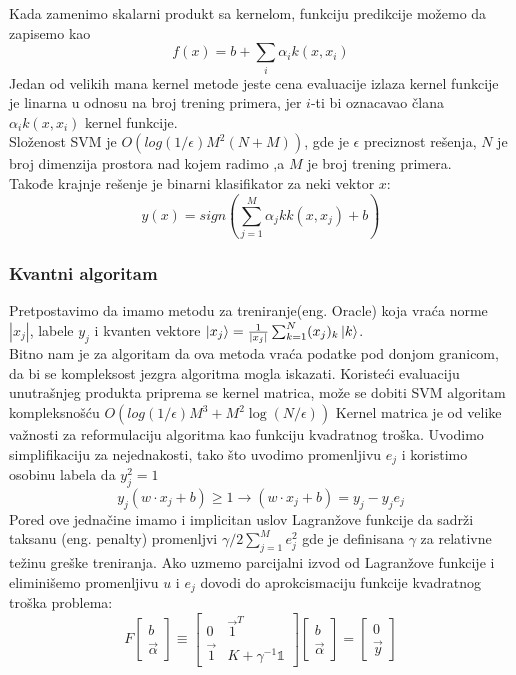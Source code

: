 \documentclass[12pt, letterpaper, oneside]{article}
\begin{document}
Kada zamenimo skalarni produkt sa kernelom, funkciju predikcije možemo da zapisemo kao
\[
    f(x) = b + \sum_i \alpha_{i}k(x,x_i)
\]
Jedan od velikih mana kernel metode jeste cena evaluacije izlaza kernel funkcije je linarna u odnosu na broj trening primera, jer $i$-ti bi oznacavao člana $\alpha_ik(x,x_i)$ kernel funkcije. \cite{goodfellow2016deep} \\
Složenost SVM je $O(log(1/\epsilon)M^2(N+M))$, gde je $\epsilon$ preciznost rešenja, $N$ je broj dimenzija prostora nad kojem radimo ,a $M$ je broj trening primera. \\
Takođe krajnje rešenje je binarni klasifikator za neki vektor $x$:
\[
    y(x) = sign(\sum_{j=1}^{M}\alpha_jkk(x,x_j) + b)
\]

\subsubsection{Kvantni algoritam}
Pretpostavimo da imamo metodu za treniranje(eng. Oracle) koja vraća norme $|x_j|$, labele $y_j$ i kvanten vektore $\Ket{x_j} = \frac{1}{|x_j|}\sum_{k=1}^{N}(x_j)_k\Ket{k}$. \\
Bitno nam je za algoritam da ova metoda vraća podatke pod donjom granicom, da bi se kompleksost jezgra algoritma mogla iskazati.
Koristeći evaluaciju unutrašnjeg produkta priprema se kernel matrica, može se dobiti SVM algoritam kompleksnošću $O(log(1/\epsilon)M^3 + M^{2}\log(N/\epsilon))$
Kernel matrica je od velike važnosti za reformulaciju algoritma kao funkciju kvadratnog troška. 
Uvodimo simplifikaciju za nejednakosti, tako što uvodimo promenljivu $e_j$ i koristimo osobinu labela da $y_j^2=1$
\[
    y_{j}(w \cdot x_j + b) \geq 1 \to (w \cdot x_j + b) = y_{j} - y_{j}e_{j}
\]
Pored ove jednačine imamo i implicitan uslov Lagranžove funkcije da sadrži taksanu (eng. penalty) promenljvi
$\gamma/2\sum_{j=1}^{M}e_j^2$ gde je definisana $\gamma$ za relativne težinu greške treniranja.
Ako uzmemo parcijalni izvod od Lagranžove funkcije i eliminišemo promenljivu $u$ i $e_j$ dovodi do aprokcismaciju funkcije kvadratnog troška problema:
\[
    F\begin{bmatrix}
        b \\
        \overrightarrow{\alpha}
    \end{bmatrix}
    \equiv \begin{bmatrix}
        0 & \overrightarrow{1}^T \\
        \overrightarrow{1} & K+\gamma^{-1} \mathbb{1}
    \end{bmatrix}
    \begin{bmatrix}
        b \\
        \overrightarrow{\alpha}
    \end{bmatrix} =
    \begin{bmatrix}
        0 \\
        \overrightarrow{y}
    \end{bmatrix}
\]
\end{document}

